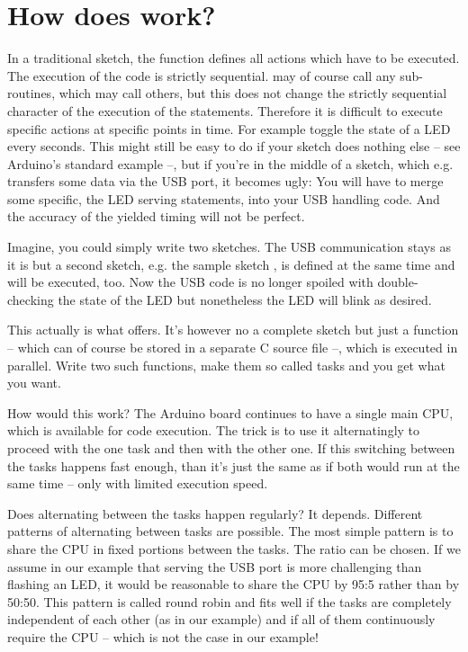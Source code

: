 \chapter{How does \rtos{} work?}

In a traditional sketch, the function  defines all actions
which have to be executed. The execution of the code is strictly
sequential.  may of course call any sub-routines, which may
call others, but this does not change the strictly sequential character of
the execution of the statements. Therefore it is difficult to execute
specific actions at specific points in time. For example toggle the state
of a LED every seconds. This might still be easy to do if your sketch does
nothing else -- see Arduino's standard example  --, but if
you're in the middle of a sketch, which e.g. transfers some data via the
USB port, it becomes ugly: You will have to merge some specific, the LED
serving statements, into your USB handling code. And the accuracy of the
yielded timing will not be perfect.

Imagine, you could simply write two sketches. The USB communication stays
as it is but a second sketch, e.g. the sample sketch , is
defined at the same time and will be executed, too. Now the USB code is no
longer spoiled with double-checking the state of the LED but nonetheless
the LED will blink as desired.

This actually is what \rtos{} offers. It's however no a complete sketch
but just a function -- which can of course be stored in a separate C
source file --, which is executed in parallel. Write two such functions,
make them so called tasks and you get what you want.

How would this work? The Arduino board continues to have a single main
CPU, which is available for code execution. The trick is to use it
alternatingly to proceed with the one task and then with the other one. If
this switching between the tasks happens fast enough, than it's just the
same as if both would run at the same time -- only with limited execution
speed.

Does alternating between the tasks happen regularly? It depends. Different
patterns of alternating between tasks are possible. The most simple
pattern is to share the CPU in fixed portions between the tasks. The ratio
can be chosen. If we assume in our example that serving the USB port is
more challenging than flashing an LED, it would be reasonable to share the
CPU by 95:5 rather than by 50:50. This pattern is called round robin and
fits well if the tasks are completely independent of each other (as in our
example) and if all of them continuously require the CPU -- which is not
the case in our example!

